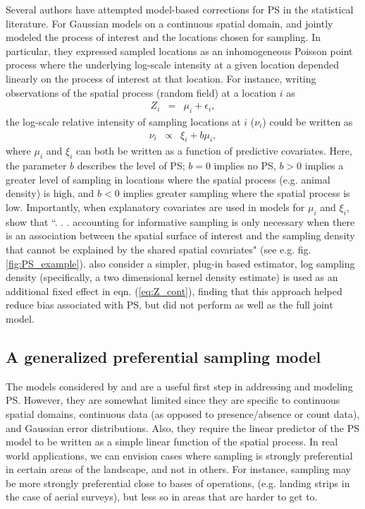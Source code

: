 \documentclass[times,mee,doublespace,]{besauth2}
\begin{document}
Several authors have attempted model-based corrections for PS in the statistical literature. For Gaussian models on a continuous spatial domain, \citet{DiggleEtAl2010} and \citet{PatiEtAl2011} jointly modeled the process of interest and the locations chosen for sampling.  In particular, they expressed sampled locations as an inhomogeneous Poisson point process where the underlying log-scale intensity at a given location depended linearly on the process of interest at that location.  For instance, writing observations of the spatial process (random field) at a location $i$ as
\begin{eqnarray}
   Z_i & = & \mu_i + \epsilon_i,
   \label{eq:Z_cont}
\end{eqnarray}
the log-scale relative intensity of sampling locations at $i$ ($\nu_i$) could be written as
\begin{eqnarray}
   \nu_i & \propto & \xi_i + b \mu_i,
   \label{eq:p_cont}
\end{eqnarray}
where $\mu_i$ and $\xi_i$ can both be written as a function of predictive covariates.
Here, the parameter $b$ describes the level of PS; $b=0$ implies no PS, $b>0$ implies a greater level of sampling in locations where the spatial process (e.g. animal density) is high, and $b<0$ implies greater sampling where the spatial process is low.  Importantly, when explanatory covariates are used in models for $\mu_i$ and $\xi_i$, \citet{PatiEtAl2011} show that ``. . . accounting for informative sampling is only necessary when there
is an association between the spatial surface of interest and the sampling density that cannot be
explained by the shared spatial covariates" (see e.g. fig. \ref{fig:PS_example}).    \citet{PatiEtAl2011} also consider a simpler, plug-in based estimator, log sampling density (specifically, a two dimensional kernel density estimate) is used as an additional fixed effect in eqn. (\ref{eq:Z_cont}), finding that this approach helped reduce bias associated with PS, but did not perform as well as the full joint model.

\subsection{A generalized preferential sampling model}

The models considered by \citet{DiggleEtAl2010} and \citet{PatiEtAl2011} are a useful first step in addressing and modeling PS.  However, they are somewhat limited since they are specific to continuous spatial domains, continuous data (as opposed to presence/absence or count data), and Gaussian error distributions.  Also, they require the linear predictor of the PS model to be written as a simple linear function of the spatial process.  In real world applications, we can envision cases where sampling is strongly preferential in certain areas of the landscape, and not in others.  For instance, sampling may be more strongly preferential close to bases of operations, (e.g. landing strips in the case of aerial surveys), but less so in areas that are harder to get to.
\end{document}
